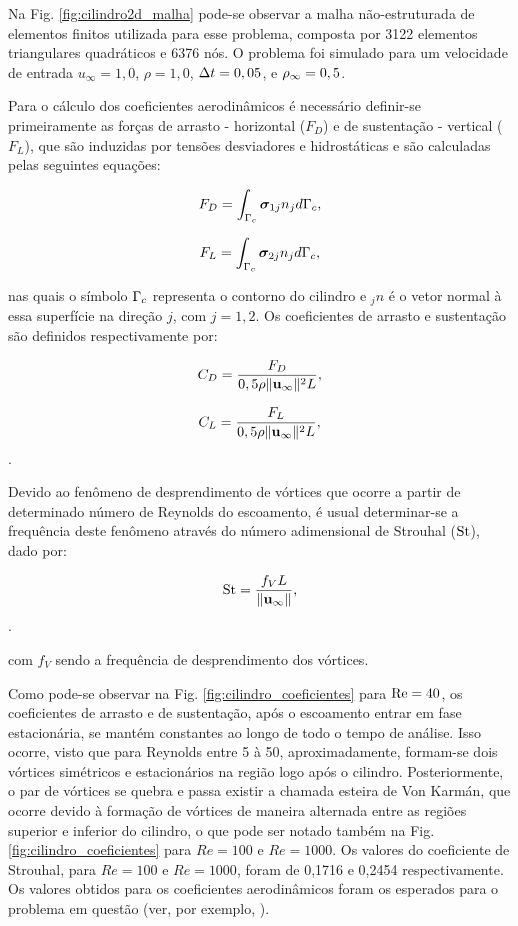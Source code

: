 \documentclass[tese_patricia]{subfiles}%
\begin{document}
Na Fig. \ref{fig:cilindro2d_malha} pode-se observar a malha não-estruturada de elementos finitos utilizada para esse problema, composta por 3122 elementos triangulares quadráticos e 6376 nós. O problema foi simulado para um velocidade de entrada $u_{\infty} = 1,0$, $\rho = 1,0$, $\Delta t = 0,05$, e $\rho_\infty = 0,5$. 

Para o cálculo dos coeficientes aerodinâmicos é necessário definir-se primeiramente as forças de arrasto - horizontal ($F_D$) e de sustentação - vertical ($F_L$), que são induzidas por tensões desviadores e hidrostáticas e são calculadas pelas seguintes equações:

\begin{align}
F_D = \int_{\Gamma_{c}} \boldsymbol{\sigma}_{1j}n_{j} d\Gamma_{c},
\end{align}

\begin{align}
F_L = \int_{\Gamma_{c}} \boldsymbol{\sigma}_{2j}n_{j} d\Gamma_{c},
\end{align}

\noindent nas quais o símbolo $\Gamma_{c}$ representa o contorno do cilindro e $_jn$ é o vetor normal à essa superfície na direção $j$, com $j=1,2$. Os coeficientes de arrasto e sustentação são definidos respectivamente por:

\begin{align}
	C_D = \frac{F_D}{0,5\rho \lVert \mathbf{u}_{\infty} \lVert^{2} L},
\end{align}

\begin{align}
	C_L = \frac{F_L}{0,5\rho \lVert \mathbf{u}_{\infty} \lVert^{2} L},
\end{align}.

Devido ao fenômeno de desprendimento de vórtices que ocorre a partir de determinado número de Reynolds do escoamento, é usual determinar-se a frequência deste fenômeno através do número adimensional de Strouhal ($\mathrm{St}$), dado por:

\begin{align}
	\mathrm{St} = \frac{f_{V}L}{\lVert \mathbf{u}_{\infty} \lVert},
\end{align}.

\noindent com $f_{V}$ sendo a frequência de desprendimento dos vórtices.

Como pode-se observar na Fig. \ref{fig:cilindro_coeficientes} para $\mathrm{Re} = 40$, os coeficientes de arrasto e de sustentação, após o escoamento entrar em fase estacionária, se mantém constantes ao longo de todo o tempo de análise. Isso ocorre, visto que para Reynolds entre 5 à 50, aproximadamente, formam-se dois vórtices simétricos e estacionários na região logo após o cilindro. Posteriormente, o par de vórtices se quebra e passa existir a chamada esteira de Von Karmán, que ocorre devido à formação de vórtices de maneira alternada entre as regiões superior e inferior do cilindro, o que pode ser notado também na Fig. \ref{fig:cilindro_coeficientes}  para $Re = 100$ e $Re=1000$. Os valores do coeficiente de Strouhal, para $Re = 100$ e $Re=1000$, foram de 0,1716 e 0,2454 respectivamente. Os valores obtidos para os coeficientes aerodinâmicos foram os esperados para o problema em questão (ver, por exemplo, ).
\end{document}

